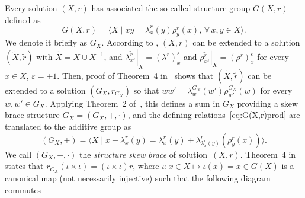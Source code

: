 \documentclass[12pt, a4paper, english]{article}
\theoremstyle{definition}
\theoremstyle{remark}
\begin{document}
Every solution $(X,r)$ has associated the so-called structure group $G(X,r)$ defined as
\begin{equation}
G(X,r)  = \langle X \mid xy = \lambda^r_x(y)\rho^r_y(x), \,\forall\,x,y\in \! X\rangle. \label{eq:G(X,r)prod} 
\end{equation}
We denote it briefly as $G_X$. According to \cite[Proposition~5]{LuYanZhu00}, $(X,r)$ can be extended to a solution $(\tilde{X}, \tilde{r})$ with $\tilde{X} = X\cup X^{-1}$, and $\left.\lambda^{\tilde{r}}_{x^{\varepsilon}}\right|_X = (\lambda^r)_x^{\varepsilon}$ and $\left.\rho^{\tilde{r}}_{x^{\varepsilon}}\right|_X= (\rho^r)_x^{\varepsilon}$ for every $x\in X$, $\varepsilon = \pm 1$.  Then, proof of Theorem~4 in~\cite{LuYanZhu00} shows that $(\tilde{X}, \tilde{r})$ can be extended to a solution $(G_X, r_{G_X})$ 
so that $w w' = \lambda^{G_X}_w(w')\rho^{G_X}_{w'}(w)$ for every $w, w'\in G_X$. Applying Theorem~2 of~\cite{LuYanZhu00}, this defines a sum in $G_X$ providing a skew brace structure $G_X = (G_X,+,\cdot)$, and the defining relations~\eqref{eq:G(X,r)prod} are translated to the additive group as
\begin{equation}
\label{eq:G(X,r)sum}
(G_X,+) = \langle X \mid x + \lambda^r_x(y) = \lambda_x^r(y) + \lambda_{\lambda_x^r(y)}^r(\rho^r_y(x))\rangle.
\end{equation}
We call $(G_X,+,\cdot)$ the \emph{structure skew brace} of solution~$(X,r)$. Theorem~4 in~\cite{LuYanZhu00} states that $r_{G_X}(\iota \times \iota) = (\iota \times \iota)r$,  where $\iota\colon x\in X \mapsto \iota(x) = x\in G(X)$ is a canonical map (not necessarily injective) such that the following diagram commutes
\end{document}
